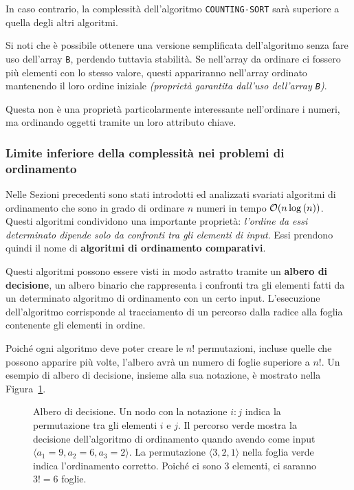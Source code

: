 \documentclass[italian, 10pt]{article}
\begin{document}
In caso contrario, la complessità dell'algoritmo \texttt{COUNTING-SORT} sarà superiore a quella degli altri algoritmi.

\bigskip
Si noti che è possibile ottenere una versione semplificata dell'algoritmo senza fare uso dell'array \texttt{B}, perdendo tuttavia stabilità.
Se nell'array da ordinare ci fossero più elementi con lo stesso valore, questi appariranno nell'array ordinato mantenendo il loro ordine iniziale \textit{(proprietà garantita dall'uso dell'array \texttt{B})}.

Questa non è una proprietà particolarmente interessante nell'ordinare i numeri, ma ordinando oggetti tramite un loro attributo chiave.

\subsubsection{Limite inferiore della complessità nei problemi di ordinamento}

Nelle Sezioni precedenti sono stati introdotti ed analizzati svariati algoritmi di ordinamento che sono in grado di ordinare \(n\) numeri in tempo \(\mathcal{O}(n \log{(n)})\).
Questi algoritmi condividono una importante proprietà: \textit{l'ordine da essi determinato dipende solo da confronti tra gli elementi di input}.
Essi prendono quindi il nome di \textbf{algoritmi di ordinamento comparativi}.

Questi algoritmi possono essere visti in modo astratto tramite un \textbf{albero di decisione}, un albero binario che rappresenta i confronti tra gli elementi fatti da un determinato algoritmo di ordinamento con un certo input.
L'esecuzione dell'algoritmo corrisponde al tracciamento di un percorso dalla radice alla foglia contenente gli elementi in ordine.

Poiché ogni algoritmo deve poter creare le \(n!\) permutazioni, incluse quelle che possono apparire più volte, l'albero avrà un numero di foglie superiore a \(n!\).
Un esempio di albero di decisione, insieme alla sua notazione, è mostrato nella Figura~\ref{fig:albero-di-decisione-esempio}.

\begin{figure}[htbp]
  \bigskip
  \centering
  \caption{Albero di decisione. Un nodo con la notazione \(i : j\) indica la permutazione tra gli elementi \(i\) e \(j\). Il percorso verde mostra la decisione dell'algoritmo di ordinamento quando avendo come input \(\langle a_1 = 9, a_2 = 6, a_3  = 2\rangle\). La permutazione \(\langle 3, 2, 1 \rangle\) nella foglia verde indica l'ordinamento corretto. Poiché ci sono \(3\) elementi, ci saranno \(3! = 6\) foglie.}
  \label{fig:albero-di-decisione-esempio}
  \bigskip
\end{figure}
\end{document}
